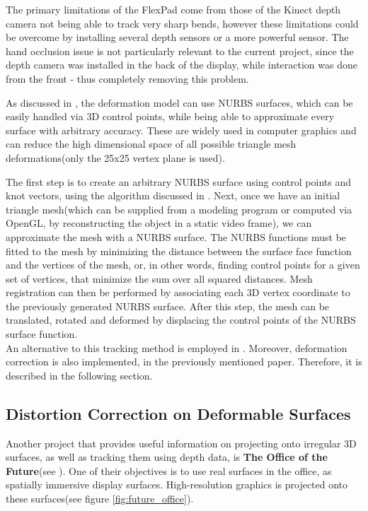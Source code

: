 \documentclass[]{article}
\begin{document}
The primary limitations of the FlexPad come from those of the Kinect depth camera not being able to track very sharp bends, however these limitations could be overcome by installing several depth sensors or a more powerful sensor. The hand occlusion issue is not particularly relevant to the current project, since the depth camera was installed in the back of the display, while interaction was done from the front - thus completely removing this problem.

As discussed in \cite{jordt12}, the deformation model can use NURBS surfaces, which can be easily handled via 3D control points, while being able to approximate every surface with arbitrary accuracy. These are widely used in computer graphics and can reduce the high dimensional space of all possible triangle mesh deformations(only the 25x25 vertex plane is used).

The first step is to create an arbitrary NURBS surface using control points and knot vectors, using the algorithm discussed in \cite{jordt12}. Next, once we have an initial triangle mesh(which can be supplied from a modeling program or computed via OpenGL, by reconstructing the object in a static video frame), we can approximate the mesh with a NURBS surface. The NURBS functions must be fitted to the mesh by minimizing the distance between the surface face function and the vertices of the mesh, or, in other words, finding control points for a given set of vertices, that minimize the sum over all squared distances. Mesh registration can then be performed by associating each 3D vertex coordinate to the previously generated NURBS surface. After this step, the mesh can be translated, rotated and deformed by displacing the control points of the NURBS surface function.\\

An alternative to this tracking method is employed in \cite{watanabe08}. Moreover, deformation correction is also implemented, in the previously mentioned paper. Therefore, it is described in the following section.


\subsection{Distortion Correction on Deformable Surfaces}

Another project that provides useful information on projecting onto irregular 3D surfaces, as well as tracking them using depth data, is \textbf{The Office of the Future}(see \cite{raskar98}). One of their objectives is to use real surfaces in the office, as spatially immersive display surfaces. High-resolution graphics is projected onto these surfaces(see figure \ref{fig:future_office}).
\end{document}

